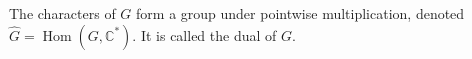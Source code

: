 The characters of $G$ form a group under pointwise multiplication, denoted $\hat{G} = \operatorname{Hom}(G, \mathbb{C}^*)$. It is called the dual of $G$.
